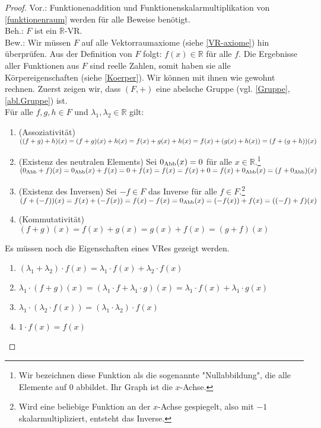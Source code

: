 \newpage
\begin{proof}
Vor.: Funktionenaddition und Funktionenskalarmultiplikation von \ref{funktionenraum} werden für alle Beweise benötigt.
\\ Beh.: $F$ ist ein $\mathbb{R}$-\acl{VR}.
\\ Bew.: Wir müssen $F$ auf alle Vektorraumaxiome (siehe \ref{VR-axiome}) hin überprüfen. Aus der Definition von $F$ folgt: \(f(x) \in \mathbb{R}\) für alle $f$. Die Ergebnisse aller Funktionen aus $F$ sind reelle Zahlen, somit haben sie alle Körpereigenschaften (siehe \ref{Koerper}). Wir können mit ihnen wie gewohnt rechnen. Zuerst zeigen wir, dass $(F,+)$ eine abelsche Gruppe (vgl. \ref{Gruppe}, \ref{abl.Gruppe}) ist.
\\Für alle $f,g,h \in F$ und $\lambda_1, \lambda_2 \in \mathbb{R}$ gilt:
\begin{enumerate}
\item (Assoziativität)
\( ((f+g)+h)(x)=(f+g)(x)+h(x)=f(x)+g(x)+h(x)=\\f(x)+(g(x)+h(x))=(f+(g+h))(x)\)
\item(Existenz des neutralen Elements) Sei $0_{\operatorname{Abb}}(x)=0$ für alle $x \in \mathbb{R}$.\footnote{Wir bezeichnen diese Funktion als die sogenannte "Nullabbildung", die alle Elemente auf $0$ abbildet. Ihr Graph ist die $x$-Achse.} \\ \( (0_{\operatorname{Abb}}+f)(x) = 0_{\operatorname{Abb}}(x) + f(x)= 0+ f(x)=f(x)=f(x)+0=f(x)+ 0_{\operatorname{Abb}}(x)=(f+0_{\operatorname{Abb}})(x) \)
\item(Existenz des Inversen) Sei $-f \in F$ das Inverse für alle $f\in F$.\footnote{Wird eine beliebige Funktion an der $x$-Achse gespiegelt, also mit $-1$ skalarmultipliziert, entsteht das Inverse.}
\\ \( (f+(-f))(x) =  f(x) + (-f(x))= f(x)-f(x) = 0_{\operatorname{Abb}}(x) =  (-f(x)) + f(x)= ((-f) + f)(x)\) 
\item(Kommutativität) \((f+g)(x)=f(x)+g(x)=g(x)+f(x)=(g+f)(x)\)
\end{enumerate}

Es müssen noch die Eigenschaften eines \acl{VR}es gezeigt werden.
\begin{enumerate}
\item \((\lambda_1+\lambda_2)\cdot f(x) = \lambda_1 \cdot f(x) + \lambda_2 \cdot  f(x)\)
\item \( \lambda_1 \cdot (f + g)(x) = (\lambda_1 \cdot f + \lambda_1 \cdot  g)(x) = \lambda_1 \cdot f(x) + \lambda_1 \cdot  g(x)\)
\item \( \lambda_1 \cdot (\lambda_2 \cdot f(x)) = (\lambda_1 \cdot \lambda_2) \cdot f(x) \)
\item \(1 \cdot f(x) = f(x)\)
\qedhere
\end{enumerate}
\end{proof}
\newpage
